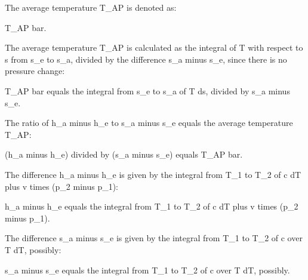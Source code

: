 The average temperature T_AP is denoted as:

T_AP bar.

The average temperature T_AP is calculated as the integral of T with respect to s from s_e to s_a, divided by the difference s_a minus s_e, since there is no pressure change:

T_AP bar equals the integral from s_e to s_a of T ds, divided by s_a minus s_e.

The ratio of h_a minus h_e to s_a minus s_e equals the average temperature T_AP:

(h_a minus h_e) divided by (s_a minus s_e) equals T_AP bar.

The difference h_a minus h_e is given by the integral from T_1 to T_2 of c dT plus v times (p_2 minus p_1):

h_a minus h_e equals the integral from T_1 to T_2 of c dT plus v times (p_2 minus p_1).

The difference s_a minus s_e is given by the integral from T_1 to T_2 of c over T dT, possibly:

s_a minus s_e equals the integral from T_1 to T_2 of c over T dT, possibly.